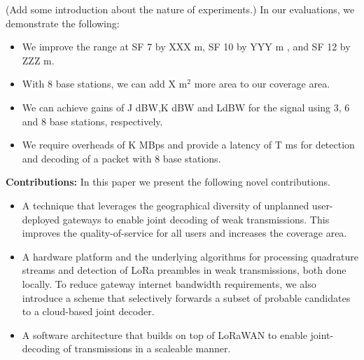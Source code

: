 
{\color{blue} (Add some introduction about the nature of experiments.)} In our evaluations, we demonstrate the following:
\begin{itemize}
    \item We improve the range at SF 7 by XXX m, SF 10 by YYY m , and SF 12 by ZZZ m.
    \item With 8 base stations, we can add X m$^2$ more area to our coverage area.
    \item We can achieve gains of J dBW,K dBW and LdBW for the signal using 3, 6 and 8 base stations, respectively.
    \item We require overheads of K MBps and provide a latency of T ms for detection and decoding of a packet with 8 base stations. 
\end{itemize}


\textbf{Contributions:} In this paper we present the following novel contributions.
\begin{itemize}
    \item A technique that leverages the geographical diversity of unplanned user-deployed gateways to enable joint decoding of weak transmissions. This improves the quality-of-service for all users and increases the coverage area.
    \item A hardware platform and the underlying algorithms for processing quadrature streams and detection of LoRa preambles in weak transmissions, both done locally. To reduce gateway internet bandwidth requirements, we also introduce a scheme that selectively forwards a subset of probable candidates to a cloud-based joint decoder.
    \item A software architecture that builds on top of LoRaWAN to enable joint-decoding of transmissions in a scaleable manner.
\end{itemize}